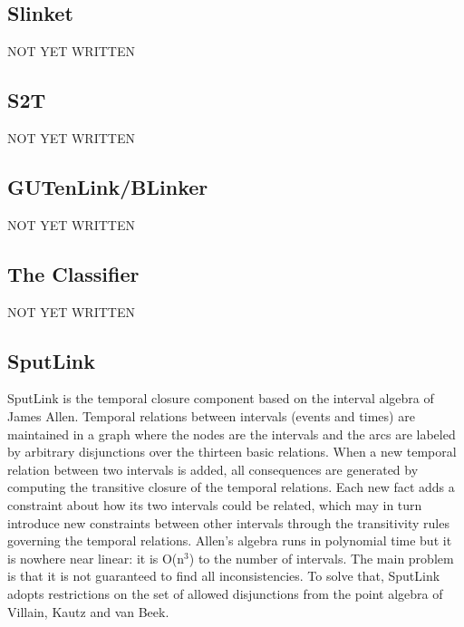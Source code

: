 \documentclass[11pt]{article}
\begin{document}
\subsection{Slinket}

NOT YET WRITTEN



\subsection{S2T}

NOT YET WRITTEN


\subsection{GUTenLink/BLinker}

NOT YET WRITTEN

\subsection{The Classifier}

NOT YET WRITTEN

\subsection{SputLink}

SputLink is the temporal closure component based on the interval algebra of James Allen. Temporal relations between intervals (events and times) are maintained in a graph where the nodes are the intervals and the arcs are labeled by arbitrary disjunctions over the thirteen basic relations. When a new temporal relation between two intervals is added, all consequences are generated by computing the transitive closure of the temporal relations. Each new fact adds a constraint about how its two intervals could be related, which may in turn introduce new constraints between other intervals through the transitivity rules governing the temporal relations. Allen's algebra runs in polynomial time but it is nowhere near linear: it is O(n$^3$) to the number of intervals. The main problem is that it is not guaranteed to find all inconsistencies. To solve that, SputLink adopts restrictions on the set of allowed disjunctions from the point algebra of Villain, Kautz and van Beek.
\end{document}
